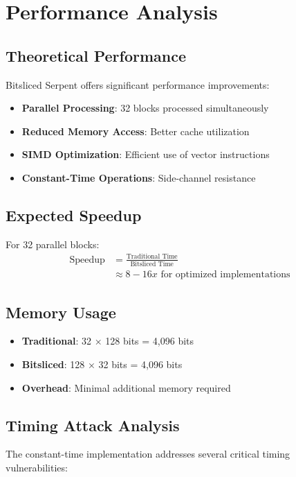 \documentclass[12pt,a4paper]{article}
\begin{document}
\section{Performance Analysis}

\subsection{Theoretical Performance}
Bitsliced Serpent offers significant performance improvements:

\begin{itemize}
    \item \textbf{Parallel Processing}: 32 blocks processed simultaneously
    \item \textbf{Reduced Memory Access}: Better cache utilization
    \item \textbf{SIMD Optimization}: Efficient use of vector instructions
    \item \textbf{Constant-Time Operations}: Side-channel resistance
\end{itemize}

\subsection{Expected Speedup}
For 32 parallel blocks:
\begin{align}
\text{Speedup} &= \frac{\text{Traditional Time}}{\text{Bitsliced Time}} \\
&\approx 8-16x \text{ for optimized implementations}
\end{align}

\subsection{Memory Usage}
\begin{itemize}
    \item \textbf{Traditional}: 32 × 128 bits = 4,096 bits
    \item \textbf{Bitsliced}: 128 × 32 bits = 4,096 bits
    \item \textbf{Overhead}: Minimal additional memory required
\end{itemize}

\subsection{Timing Attack Analysis}
The constant-time implementation addresses several critical timing vulnerabilities:
\end{document}
